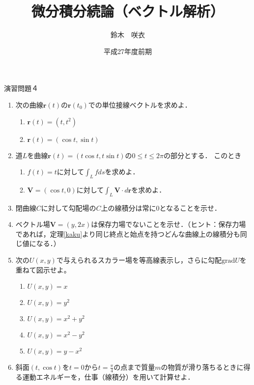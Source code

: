 \documentclass{jarticle}
\begin{document}
\title{微分積分続論（ベクトル解析）} 
\author{鈴木　咲衣}
\date{平成27年度前期}
\maketitle

\begin{center} {\Large 演習問題４ } \end{center}

\begin{enumerate}
\item \cite[問題2.42]{koba}  次の曲線$\bm r(t)$の$\bm r (t_{0})$での単位接線ベクトルを求めよ．
\begin{enumerate}
\item $\bm r(t)=(t,t^{2})$
\item $\bm r(t)=(\cos t, \sin t)$
\end{enumerate}
\item \cite[章末問題3.5]{koba} 道$L$を曲線$\bm r (t)=(t\cos t, t \sin t)$の$0\leq t\leq 2\pi$の部分とする．
このとき
\begin{enumerate}
\item $f(t)=t$に対して$\int_{L}f ds$を求めよ．
\item $\bm V=(\cos t, 0)$に対して$\int _{L}\bm V \cdot d \bm r$を求めよ．
\end{enumerate}

\item 閉曲線$C$に対して勾配場の$C$上の線積分は常に$0$となることを示せ．

\item \cite[問題6.34]{koba} ベクトル場$\bm V=(y,2x)$は保存力場でないことを示せ．（ヒント：保存力場であれば，定理\ref{kaku}より同じ終点と始点を持つどんな曲線上の線積分も同じ値になる．）


\item \cite[問題6.5]{koba} 次の$U(x,y)$で与えられるスカラー場を等高線表示し，さらに勾配$\mathrm{grad} U$を重ねて図示せよ。
\begin{enumerate}
\item $U(x,y)=x$
\item $U(x,y)=y^{2}$
\item $U(x,y)=x^{2}+y^{2}$
\item $U(x,y)=x^{2}-y^{2}$
\item $U(x,y)=y-x^{2}$
\end{enumerate}
\item \cite[問題3.14]{koba}斜面$(t,\cos t)$を$t=0$から$t=\frac{\pi}{4}$の点まで質量$m$の物質が滑り落ちるときに得る運動エネルギーを，仕事（線積分）を用いて計算せよ．
\end{enumerate}
\end{document}
